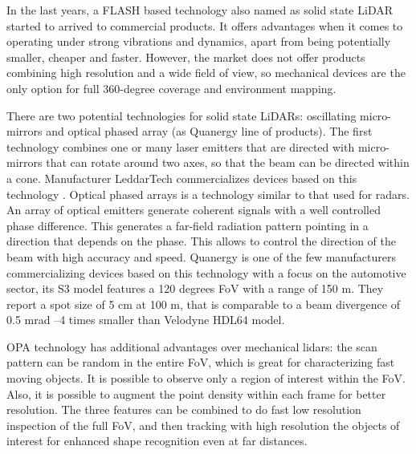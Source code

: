 In the last years, a FLASH based technology also named as solid state LiDAR
started to arrived to commercial products. It offers advantages when it comes
to operating under strong vibrations and dynamics, apart from being potentially
smaller, cheaper and faster. 
However, the market does not offer products combining high resolution and a 
wide field of view, so mechanical devices are the only option for full 
360-degree coverage and environment mapping.

There are two potential technologies for solid state LiDARs: oscillating
micro-mirrors and optical phased array (as Quanergy line of products).
The first technology combines one or many laser emitters that are directed
with micro-mirrors that can rotate around two axes, so that the beam 
can be directed within a cone. Manufacturer LeddarTech commercializes devices
based on this technology \cite{LeddarTech2016}.
Optical phased arrays \cite{McManamon1996} is a technology similar to that used 
for radars. An array of optical emitters generate coherent signals with a well
controlled phase difference. This generates a far-field radiation pattern 
pointing in a direction that depends on the phase. This allows to control the 
direction of the beam with high accuracy and speed. Quanergy \cite{Eldada2017} 
is one of the few manufacturers commercializing devices based on this technology
with a focus on the automotive sector, its S3 model features a 120 degrees FoV
with a range of 150 m. They report a spot size of 5 cm at 100 m, that is 
comparable to a beam divergence of 0.5 mrad --4 times smaller than Velodyne 
HDL64 model.

OPA technology has additional advantages over mechanical lidars: the scan 
pattern can be random in the entire FoV, which is great for characterizing fast 
moving objects. It is possible to observe only a region of interest within the 
FoV. Also, it is possible to augment the point density within each frame for 
better resolution. The three features can be combined to do fast low resolution 
inspection of the full FoV, and then tracking with high resolution the objects
of interest for enhanced shape recognition even at far distances.


%    





